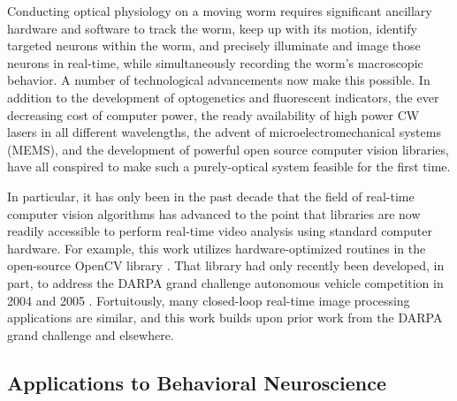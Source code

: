 Conducting optical physiology on a moving worm requires significant ancillary hardware and software to track the worm, keep up with its motion, identify targeted neurons within the worm, and precisely illuminate and image those neurons in real-time, while simultaneously recording the worm's macroscopic behavior. 
A number of technological advancements now make this possible. In addition to the development of optogenetics and fluorescent indicators, the ever decreasing cost of computer power, the ready availability of high power CW lasers in all different wavelengths,  the advent of microelectromechanical systems (MEMS), and the development of powerful open source computer vision libraries, have  all conspired to make such a purely-optical system feasible for the first time. 

In particular, it has only been in the past decade that the field of real-time computer vision algorithms has advanced to the point that libraries are now readily accessible to  perform real-time video analysis using standard computer hardware. For example, this work utilizes hardware-optimized routines in the open-source OpenCV library \citep{bradski_opencv_2000,bradski_learning_2008}. That library had only recently been developed, in part, to address the DARPA grand challenge autonomous vehicle competition in 2004 and 2005  \citep{stavens_learning_2011,buehler_stanley:_2007}. Fortuitously, many closed-loop real-time image processing applications are similar, and this work builds upon prior work from the DARPA grand challenge and elsewhere.



\subsection{Applications to Behavioral Neuroscience}


